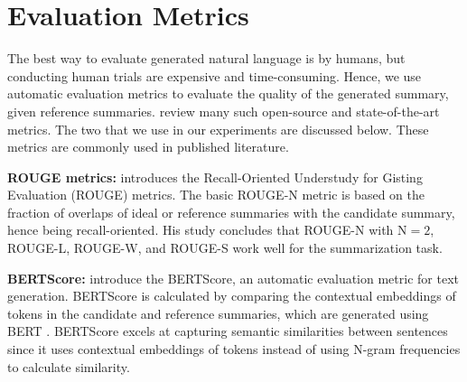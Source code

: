 \section{Evaluation Metrics}
\label{sec:metrics}

The best way to evaluate generated natural language is by humans, but conducting human trials are expensive and time-consuming.
Hence, we use automatic evaluation metrics to evaluate the quality of the generated summary, given reference summaries.
\citet{fabbri2021summeval} review many such open-source and state-of-the-art metrics.
The two that we use in our experiments are discussed below.
These metrics are commonly used in published literature.

\textbf{ROUGE metrics:} \citet{lin-2004-rouge} introduces the Recall-Oriented Understudy for Gisting Evaluation (ROUGE) metrics.
The basic ROUGE-N metric is based on the fraction of overlaps of ideal or reference summaries with the candidate summary, hence being recall-oriented.
His study concludes that ROUGE-N with $\text{N} = 2$, ROUGE-L, ROUGE-W, and ROUGE-S work well for the summarization task.

\textbf{BERTScore:} \citet{zhang2019bertscore} introduce the BERTScore, an automatic evaluation metric for text generation.
BERTScore is calculated by comparing the contextual embeddings of tokens in the candidate and reference summaries, which are generated using BERT \cite{devlin2018bert}.
BERTScore excels at capturing semantic similarities between sentences since it uses contextual embeddings of tokens instead of using N-gram frequencies to calculate similarity.
